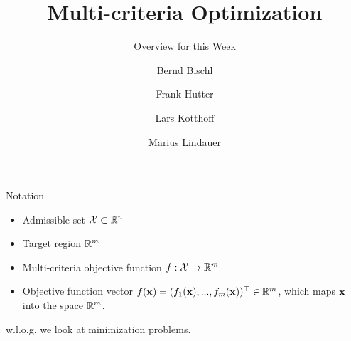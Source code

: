 


\newcommand{\a}[0]{\mathbf{a}}
\newcommand{\y}[0]{\mathbf{y}}
\newcommand{\q}[0]{\mathbf{q}}
\newcommand{\Xspace}[0]{\mathcal{X}}

\title[AutoML: Overview]{Multi-criteria Optimization}
\subtitle{Overview for this Week}
\author[Bernd Bischl]{Bernd Bischl \and Frank Hutter \and Lars Kotthoff \and \underline{Marius Lindauer}}
\institute{}
\date{}






	\maketitle


\begin{frame}{Notation}

\begin{itemize}
\item Admissible set $\Xspace \subset \realnum^n$
\item Target region $\mathbb{R}^m$
\item Multi-criteria objective function $f: \Xspace \to \realnum^m$
\item Objective function vector $f(\mathbf{x}) = \left(f_1(\mathbf{x}), ..., f_m(\mathbf{x}\right))^\top \in \mathbb{R}^m$, which maps $\mathbf{x}$ into the space $\mathbb{R}^m$.
\end{itemize}

w.l.o.g. we look at minimization problems.

\end{frame}

